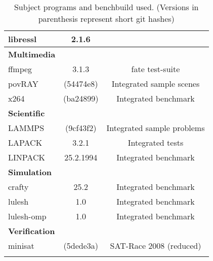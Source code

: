 \begin{longtable}{lcC}
    libressl                & 2.1.6\\
    \midrule
    \textbf{Multimedia}\\
    ffmpeg                  & 3.1.3                   & fate test-suite\\
    povRAY                  & (54474e8)               & Integrated sample scenes\\
    x264                    & (ba24899)               & Integrated benchmark\\
    \midrule
    \textbf{Scientific}\\
    LAMMPS                  & (9cf43f2)               & Integrated sample problems\\
    LAPACK                  & 3.2.1                   & Integrated tests\\
    LINPACK                 & 25.2.1994               & Integrated benchmark\\
    \midrule
    \textbf{Simulation}\\
    crafty                  & 25.2                    & Integrated benchmark\\
    lulesh                  & 1.0                     & Integrated benchmark\\
    lulesh-omp              & 1.0                     & Integrated benchmark\\
    \midrule
    \textbf{Verification}\\
    minisat                 & (5dede3a)               & SAT-Race 2008 (reduced)\\
    \bottomrule
    \caption[Subject programs]{Subject programs and benchbuild used. (Versions in parenthesis represent short git hashes)}
    \label{tab:subjectPrograms}
\end{longtable}
